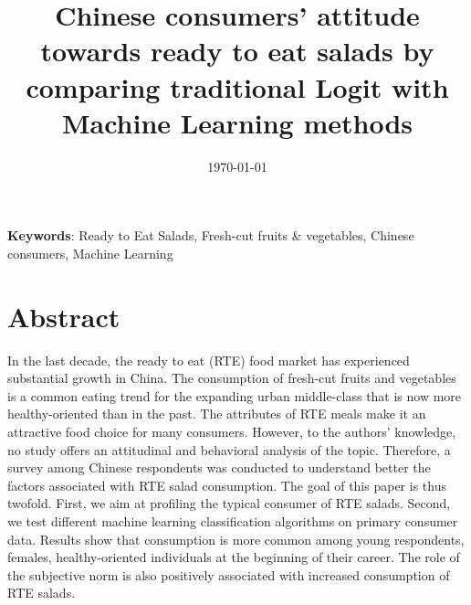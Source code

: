 \documentclass[a4,12pt]{article}
\title{Chinese consumers’ attitude towards ready to eat salads by comparing traditional Logit with Machine Learning methods}
\author{}
\date{\today}
\begin{document}
	\maketitle
	\begin{flushleft}
		\textbf{Keywords}: Ready to Eat Salads, Fresh-cut fruits \& vegetables, Chinese consumers, Machine Learning
	\end{flushleft}
	



\section{Abstract}
In the last decade, the ready to eat (RTE) food market has experienced substantial growth in China. The consumption of fresh-cut fruits and vegetables is a common eating trend for the expanding urban middle-class that is now more healthy-oriented than in the past. The attributes of RTE meals make it an attractive food choice for many consumers. However, to the authors’ knowledge, no study offers an attitudinal and behavioral analysis of the topic. Therefore, a survey among Chinese respondents was conducted to understand better the factors associated with RTE salad consumption.  The goal of this paper is thus twofold. First, we aim at profiling the typical consumer of RTE salads. Second, we test different machine learning classification algorithms on primary consumer data.
Results show that consumption is more common among young respondents, females, healthy-oriented individuals at the beginning of their career. The role of the subjective norm is also positively associated with increased consumption of RTE salads. 
\end{document}
